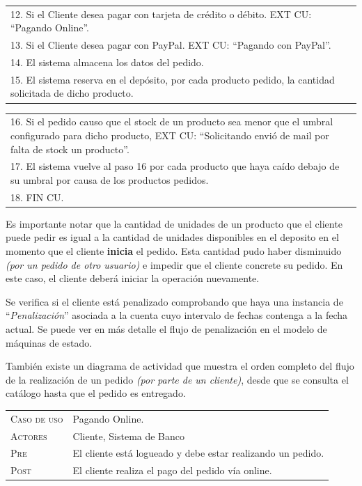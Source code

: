 \begin{center}
\begin{tabular}{|p{}|p{}|}
    12. Si el Cliente desea pagar con tarjeta de crédito o débito. EXT CU:
    ``Pagando Online''. & \\
    13. Si el Cliente desea pagar con PayPal. EXT CU: ``Pagando con PayPal''. & \\
    14. El sistema almacena los datos del pedido. & \\
    15. El sistema reserva en el depósito, por cada producto pedido, la cantidad solicitada de dicho producto. & \\
\end{tabular}
\end{center}

\begin{center}
\begin{tabular}{|p{}|p{}|}
    16. Si el pedido causo que el stock de un producto sea menor que el umbral configurado para dicho producto, EXT CU: ``Solicitando envió de mail por falta de stock un producto''. & \\
	17. El sistema vuelve al paso 16 por cada producto que haya caído debajo de su umbral por causa de los productos pedidos. & \\
    18. FIN CU. & \\
    \hline
\end{tabular}
\end{center}


Es importante notar que la cantidad de unidades de un producto que el cliente puede pedir es igual a la cantidad de unidades disponibles en el deposito en el momento que el cliente \textbf{inicia} el pedido. Esta cantidad pudo haber disminuido \textit{(por un pedido de otro usuario)} e impedir que el cliente concrete su pedido. En este caso, el cliente deberá iniciar la operación nuevamente.


Se verifica si el cliente está penalizado comprobando que haya una instancia de ``\textit{Penalización}'' asociada a la cuenta cuyo intervalo de fechas contenga a la fecha actual.
Se puede ver en más detalle el flujo de penalización en el modelo de máquinas de estado.


También existe un diagrama de actividad que muestra el orden completo del flujo de la realización de un pedido \textit{(por parte de un cliente)}, desde que se consulta el catálogo hasta que el pedido es entregado.

\vspace{2cm}

\begin{tabular}{p{} p{}}
    \textsc{Caso de uso} & Pagando Online. \\
    \textsc{Actores} & Cliente, Sistema de Banco \\
    \textsc{Pre} & El cliente está logueado y debe estar realizando un pedido. \\
    \textsc{Post} & El cliente realiza el pago del pedido vía online. \\
\end{tabular}

